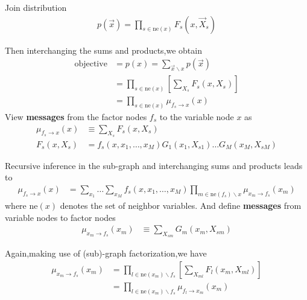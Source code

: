 Join distribution 
\begin{align}
p(\vec{x}) =\prod_{s\in \text{ne}(x)}{F_s(x,\vec{X}_s)}
\end{align}

Then interchanging the sums and products,we obtain
\begin{align}
\text{objective} &= p(x)=\sum_{\vec{x}\backslash x}{p(\vec{x})} \\
&= \prod_{s\in\text{ne}(x)}{\left[\sum_{X_s}F_s(x,X_s)\right]} \\
&= \prod_{s\in\text{ne}(x)}\mu_{f_s\rightarrow x}(x)
\end{align}
View \textbf{messages} from the factor nodes $f_s$ to the variable node $x$ as
\begin{align}
\mu_{f_s\rightarrow x}(x) &\equiv \sum_{X_s}F_s(x,X_s) \\
F_s(x,X_s) &= f_s(x,x_1,\ldots,x_M)G_1(x_1,X_{s1})\ldots G_M(x_M,X_{sM})
\end{align}

Recursive inference in the sub-graph and interchanging sums and products leads to 
\begin{align}
\mu_{f_s\rightarrow x}(x) &= \sum_{x_1}\ldots\sum_{x_M} f_s(x,x_1,\ldots,x_M)\prod_{m\in \text{ne}(f_s)\backslash x} \mu_{x_m\rightarrow f_s}(x_m) 
\end{align}
where $\text{ne}(x)$ denotes the set of neighbor variables.
And define \textbf{messages} from variable nodes to factor nodes
\begin{align}
\mu_{x_m\rightarrow f_s}(x_m) &\equiv \sum_{X_{sm}}G_m(x_m,X_{sm})
\end{align}

Again,making use of (sub)-graph factorization,we have
\begin{align}
\mu_{x_m\rightarrow f_s}(x_m) &= \prod_{l\in \text{ne}(x_m)\backslash f_s}\left[\sum_{X_{ml}}F_l(x_m,X_{ml}) \right] \\
&=\prod_{l\in \text{ne}(x_m)\backslash f_s}\mu_{f_l\rightarrow x_m}(x_m)
\end{align}


